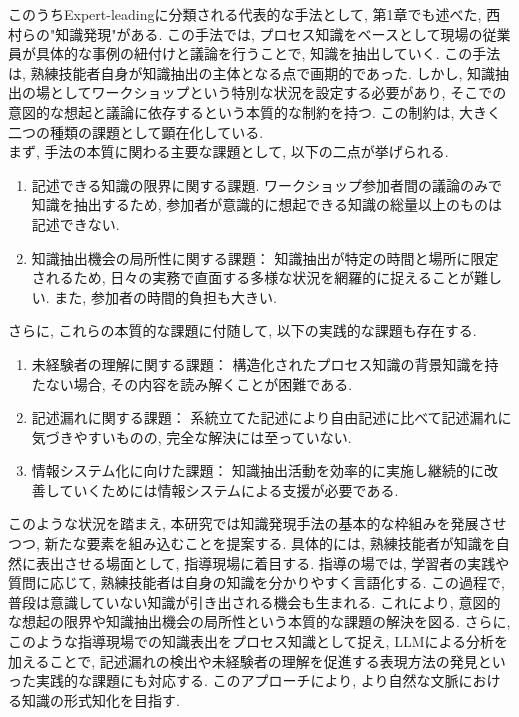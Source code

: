 このうちExpert-leadingに分類される代表的な手法として, 第1章でも述べた, 西村らの"知識発現"\cite{Nishimura2017}がある. この手法では, プロセス知識をベースとして現場の従業員が具体的な事例の紐付けと議論を行うことで, 知識を抽出していく. この手法は, 熟練技能者自身が知識抽出の主体となる点で画期的であった. しかし, 知識抽出の場としてワークショップという特別な状況を設定する必要があり, そこでの意図的な想起と議論に依存するという本質的な制約を持つ. この制約は, 大きく二つの種類の課題として顕在化している. \\

まず, 手法の本質に関わる主要な課題として, 以下の二点が挙げられる.

\begin{enumerate}
    \item 記述できる知識の限界に関する課題.
    ワークショップ参加者間の議論のみで知識を抽出するため, 参加者が意識的に想起できる知識の総量以上のものは記述できない. 
    
    \item 知識抽出機会の局所性に関する課題：
    知識抽出が特定の時間と場所に限定されるため, 日々の実務で直面する多様な状況を網羅的に捉えることが難しい. また, 参加者の時間的負担も大きい.
\end{enumerate}

さらに, これらの本質的な課題に付随して, 以下の実践的な課題も存在する.

\begin{enumerate}
    \item 未経験者の理解に関する課題：
    構造化されたプロセス知識の背景知識を持たない場合, その内容を読み解くことが困難である. 
    
    \item 記述漏れに関する課題：
    系統立てた記述により自由記述に比べて記述漏れに気づきやすいものの, 完全な解決には至っていない. 
    
    \item 情報システム化に向けた課題：
    知識抽出活動を効率的に実施し継続的に改善していくためには情報システムによる支援が必要である. 
\end{enumerate}

このような状況を踏まえ, 本研究では知識発現手法の基本的な枠組みを発展させつつ, 新たな要素を組み込むことを提案する. 具体的には, 熟練技能者が知識を自然に表出させる場面として, 指導現場に着目する. 指導の場では, 学習者の実践や質問に応じて, 熟練技能者は自身の知識を分かりやすく言語化する. この過程で, 普段は意識していない知識が引き出される機会も生まれる. これにより, 意図的な想起の限界や知識抽出機会の局所性という本質的な課題の解決を図る. さらに, このような指導現場での知識表出をプロセス知識として捉え, LLMによる分析を加えることで, 記述漏れの検出や未経験者の理解を促進する表現方法の発見といった実践的な課題にも対応する. このアプローチにより, より自然な文脈における知識の形式知化を目指す.\\

